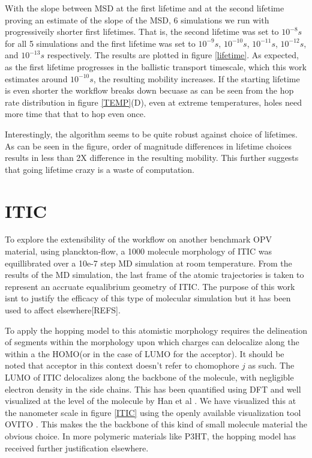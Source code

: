 With the slope between MSD at the first lifetime and at the second lifetime proving an estimate of the slope
of the MSD, 6 simulations we run with progressiveily shorter first lifetimes. That is, the second lifetime was
set to $10^{-8}s$ for all 5 simulations and the first lifetime was set to $10^{-9}s$, $10^{-10}s$,
$10^{-11}s$, $10^{-12}s$, and $10^{-13}s$ respectively. The results are plotted in figure
\ref{lifetime}. As expected, as the first lifetime progresses in the ballistic transport timescale, which this work
estimates around $10^{-10}s$, the resulting mobility increases. If the starting lifetime is even shorter the
workflow breaks down becuase as can be seen from the hop rate distribution in figure \ref{TEMP}(D), even at
extreme temperatures, holes need more time that that to hop even once. 

Interestingly, the algorithm seems to be quite robust against choice of lifetimes. As can be seen in the
figure, order of magnitude differences in lifetime choices results in less than 2X difference in the resulting
mobility. This further suggests that going lifetime crazy is a waste of computation.  

\section{ITIC}
\label{itic}

To explore the extensibility of the workflow on another benchmark OPV material, using planckton-flow, a 1000
molecule morphology of ITIC was equillibrated over a 10e-7 step MD simulation at room temperature. From the results of the MD
simulation, the last frame of the atomic trajectories is taken to represent an accruate equalibrium geometry
of ITIC. The purpose of this work isnt to justify the efficacy of this type of molecular simulation but it has
been used to affect elsewhere[REFS].

To apply the hopping model to this atomistic morphology requires the
delineation of segments within the morphology upon which charges can delocalize along the within a the HOMO(or in
the case of LUMO for the acceptor). It should be noted that acceptor in this context doesn't refer to
chomophore $j$ as such.  
The LUMO of ITIC delocalizes along the backbone of the molecule, with
negligible electron density in the side chains. This has been quantified using DFT and well visualized at the
level of the molecule by Han et al \cite{Han2019}. We have visualized this at the nanometer scale in figure \ref{ITIC} using the openly
available visualization tool OVITO \cite{Stukowski2010a}. This makes the the backbone of this kind of small molecule
material the obvious choice. In more polymeric materials like P3HT, the hopping model has received further
justification elsewhere. 

